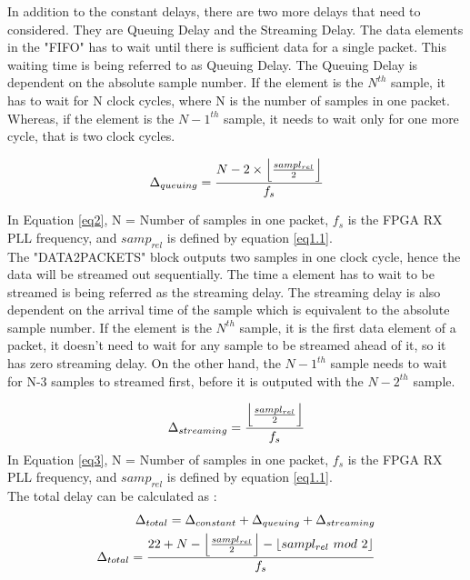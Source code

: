 In addition to the constant delays, there are two more delays that need to considered.
They are Queuing Delay and the Streaming Delay.
The data elements in the "FIFO" has to wait until there is sufficient data for a single packet.
This waiting time is being referred to as Queuing Delay.
The Queuing Delay is dependent on the absolute sample number.
If the element is the $N^{th}$ sample, it has to wait for N clock cycles, where N is the number of samples in one packet.
Whereas, if the element is the $N-1^{th}$ sample, it needs to wait only for one more cycle, that is two clock cycles.

\begin{equation} \label{eq2}
\Delta_{queuing} = \frac{N - 2 \times \floor*{\frac{sampl_{rel}}{2}}}{f_s}
\end{equation}

In Equation \ref{eq2}, N = Number of samples in one packet, $f_s$ is the \ac{FPGA} RX PLL frequency, and $samp_{rel}$ is defined by equation \ref{eq1.1}. \\

The "DATA2PACKETS" block outputs two samples in one clock cycle, hence the data will be streamed out sequentially.
The time a element has to wait to be streamed is being referred as the streaming delay.
The streaming delay is also dependent on the arrival time of the sample which is equivalent to the absolute sample number.
If the element is the $N^{th}$ sample, it is the first data element of a packet, it doesn't need to wait for any sample to be streamed ahead of it, so it has zero streaming delay.
On the other hand, the $N-1^{th}$ sample needs to wait for N-3 samples to streamed first, before it is outputed with the $N-2^{th}$ sample.

\begin{equation}\label{eq3}
\Delta_{streaming} =\frac{\floor*{\frac{sampl_{rel}}{2}}}{f_s}
\end{equation} 
In Equation \ref{eq3}, N = Number of samples in one packet,  $f_s$ is the \ac{FPGA} RX PLL frequency, and $samp_{rel}$ is defined by equation \ref{eq1.1}. \\

The total delay can be calculated as :\\
\begin{subequations}\label{eq4}
\begin{align}
\Delta_{total}= \Delta_{constant} + \Delta_{queuing} + \Delta_{streaming} \\
\Delta_{total}= \frac{22 +  N - \floor*{\frac{sampl_{rel}}{2}} - \floor*{sampl_{rel} \ mod \ 2}}{f_s}
\end{align}
\end{subequations}



